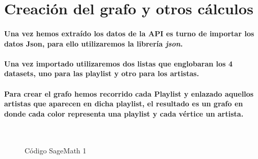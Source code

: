 \documentclass[11pt,spanish]{article}
\begin{document}
\pagebreak

\section{Creación del grafo y otros cálculos}

\paragraph*{Una vez hemos extraído los datos de la API es turno de importar los datos Json, para ello utilizaremos la librería \emph{json}.}

\paragraph*{Una vez importado utilizaremos dos listas que englobaran los 4 datasets, uno para las playlist y otro para los artistas.}

\paragraph*{Para crear el grafo hemos recorrido cada Playlist y enlazado aquellos artistas que aparecen en dicha playlist, 
el resultado es un grafo en donde cada color representa una playlist y cada vértice un artista.}



\begin{figure}[H]
	\begin{center}
%
	   
	   \\ %
	  
%
	\end{center}
	\caption{%
	Código SageMath 1
 	}%
	\label{fig:codigoSage1}
\end{figure}
\end{document}
